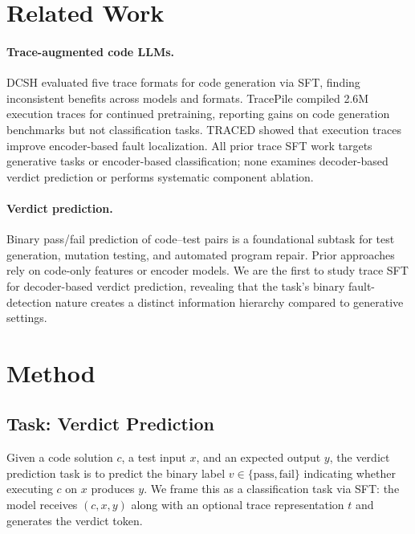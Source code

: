 \documentclass[11pt,a4paper]{article}
\begin{document}
\section{Related Work}

\paragraph{Trace-augmented code LLMs.}
DCSH \cite{ni2024next} evaluated five trace formats for code generation via SFT, finding inconsistent benefits across models and formats.
TracePile \cite{gu2025tracepile} compiled 2.6M execution traces for continued pretraining, reporting gains on code generation benchmarks but not classification tasks.
TRACED \cite{ding2024traced} showed that execution traces improve encoder-based fault localization.
All prior trace SFT work targets generative tasks or encoder-based classification; none examines decoder-based verdict prediction or performs systematic component ablation.

\paragraph{Verdict prediction.}
Binary pass/fail prediction of code--test pairs is a foundational subtask for test generation, mutation testing, and automated program repair.
Prior approaches rely on code-only features or encoder models.
We are the first to study trace SFT for decoder-based verdict prediction, revealing that the task's binary fault-detection nature creates a distinct information hierarchy compared to generative settings.

\section{Method}

\subsection{Task: Verdict Prediction}

Given a code solution $c$, a test input $x$, and an expected output $y$, the verdict prediction task is to predict the binary label $v \in \{\text{pass}, \text{fail}\}$ indicating whether executing $c$ on $x$ produces $y$.
We frame this as a classification task via SFT: the model receives $(c, x, y)$ along with an optional trace representation $t$ and generates the verdict token.
\end{document}
